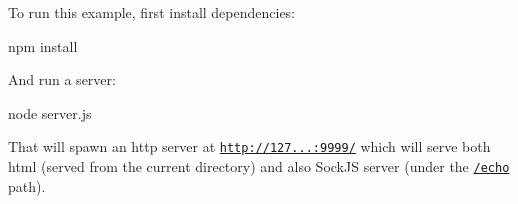 To run this example, first install dependencies\+: \begin{DoxyVerb}npm install
\end{DoxyVerb}


And run a server\+: \begin{DoxyVerb}node server.js
\end{DoxyVerb}


That will spawn an http server at \href{http://127.0.0.1:9999/}{\tt http\+://127...\+:9999/} which will serve both html (served from the current directory) and also Sock\+JS server (under the \href{http://127.0.0.1:9999/echo}{\tt /echo} path). 